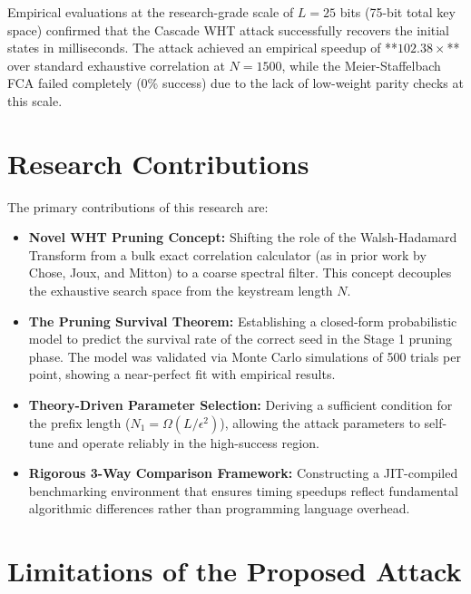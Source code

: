 Empirical evaluations at the research-grade scale of $L=25$ bits (75-bit total key space) confirmed that the Cascade WHT attack successfully recovers the initial states in milliseconds. The attack achieved an empirical speedup of **$102.38\times$** over standard exhaustive correlation at $N=1500$, while the Meier-Staffelbach FCA failed completely ($0\%$ success) due to the lack of low-weight parity checks at this scale.

\section{Research Contributions}
\label{sec:contributions}

The primary contributions of this research are:
\begin{itemize}
    \item \textbf{Novel WHT Pruning Concept:} Shifting the role of the Walsh-Hadamard Transform from a bulk exact correlation calculator (as in prior work by Chose, Joux, and Mitton) to a coarse spectral filter. This concept decouples the exhaustive search space from the keystream length $N$.
    \item \textbf{The Pruning Survival Theorem:} Establishing a closed-form probabilistic model to predict the survival rate of the correct seed in the Stage 1 pruning phase. The model was validated via Monte Carlo simulations of 500 trials per point, showing a near-perfect fit with empirical results.
    \item \textbf{Theory-Driven Parameter Selection:} Deriving a sufficient condition for the prefix length ($N_1 = \Omega(L / \epsilon^2)$), allowing the attack parameters to self-tune and operate reliably in the high-success region.
    \item \textbf{Rigorous 3-Way Comparison Framework:} Constructing a JIT-compiled benchmarking environment that ensures timing speedups reflect fundamental algorithmic differences rather than programming language overhead.
\end{itemize}

\section{Limitations of the Proposed Attack}
\label{sec:limitations}

